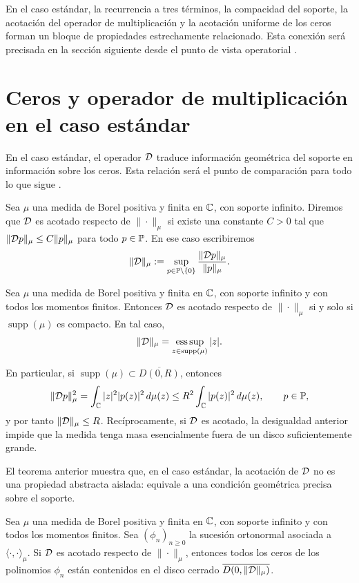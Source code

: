 En el caso estándar, la recurrencia a tres términos, la compacidad del soporte, la
acotación del operador de multiplicación y la acotación uniforme de los ceros
forman un bloque de propiedades estrechamente relacionado. Esta conexión será
precisada en la sección siguiente desde el punto de vista operatorial
\cite{CastroDuran2003}.

\section{Ceros y operador de multiplicación en el caso estándar}
\label{sec:ceros_operador_estandar}

En el caso estándar, el operador \(\mathcal{D}\) traduce información geométrica del soporte
en información sobre los ceros. Esta relación será el punto de comparación para
todo lo que sigue \cite{CastroDuran2003}.

Sea \(\mu\) una medida de Borel positiva y finita en \(\mathbb{C}\), con soporte infinito.
Diremos que \(\mathcal{D}\) es acotado respecto de \(\|\cdot\|_\mu\) si existe una
constante \(C>0\) tal que \(\|\mathcal{D} p\|_\mu\le C\|p\|_\mu\) para todo
\(p\in\mathbb{P}\).
En ese caso escribiremos
\[
	\|\mathcal{D}\|_\mu:=
	\sup_{p\in\mathbb{P}\setminus\{0\}}
	\frac{\|\mathcal{D} p\|_\mu}{\|p\|_\mu}.
\]

\begin{thm}
	\label{thm:intro_soporte_compacto_estandar}
	Sea \(\mu\) una medida de Borel positiva y finita en \(\mathbb{C}\), con soporte infinito y
	con todos los momentos finitos. Entonces \(\mathcal{D}\) es acotado respecto de
	\(\|\cdot\|_\mu\) si y solo si \(\operatorname{supp}(\mu)\) es compacto. En tal
	caso,
	\[
		\|\mathcal{D}\|_\mu=
		\operatorname*{ess\,sup}_{z\in\operatorname{supp}(\mu)} |z|.
	\]
\end{thm}

En particular, si \(\operatorname{supp}(\mu)\subset \overline{D(0,R)}\), entonces
\[
	\|\mathcal{D} p\|_\mu^2
	=
	\int_{\mathbb{C}}|z|^2|p(z)|^2\,d\mu(z)
	\le
	R^2\int_{\mathbb{C}}|p(z)|^2\,d\mu(z),
	\qquad p\in\mathbb{P},
\]
y por tanto \(\|\mathcal{D}\|_\mu\le R\). Recíprocamente, si \(\mathcal{D}\) es acotado,
la desigualdad anterior impide que la medida tenga masa esencialmente fuera de un
disco suficientemente grande.

El teorema anterior muestra que, en el caso estándar, la acotación de \(\mathcal{D}\) no es
una propiedad abstracta aislada: equivale a una condición geométrica precisa sobre
el soporte.

\begin{thm}
	\label{thm:intro_D_implica_ceros}
	Sea \(\mu\) una medida de Borel positiva y finita en \(\mathbb{C}\), con soporte infinito y
	con todos los momentos finitos. Sea \((\phi_n)_{n\ge 0}\) la sucesión ortonormal
	asociada a \(\langle\cdot,\cdot\rangle_\mu\). Si \(\mathcal{D}\) es acotado respecto de
	\(\|\cdot\|_\mu\), entonces todos los ceros de los polinomios \(\phi_n\) están
	contenidos en el disco cerrado \(\overline{D(0,\|\mathcal{D}\|_\mu)}\).
\end{thm}

